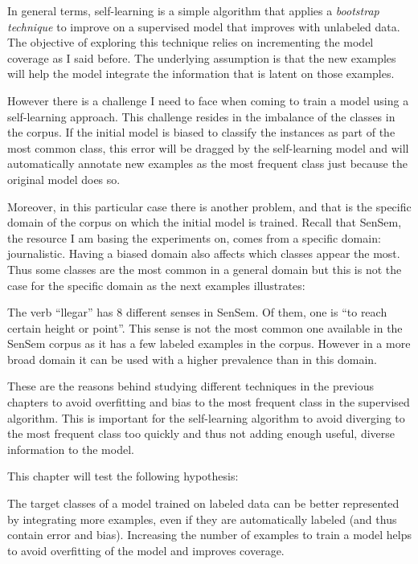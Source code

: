 In general terms, self-learning is a simple algorithm that applies a {\em
bootstrap technique} to improve on a supervised model that improves with
unlabeled data. The objective of exploring this technique relies on
incrementing the model coverage as I said before. The underlying assumption is
that the new examples will help the model integrate the information that is
latent on those examples.

However there is a challenge I need to face when coming to train a model using
a self-learning approach. This challenge resides in the imbalance of the
classes in the corpus. If the initial model is biased to classify the instances
as part of the most common class, this error will be dragged by the
self-learning model and will automatically annotate new examples as the most
frequent class just because the original model does so. 

Moreover, in this particular case there is another problem, and that is the
specific domain of the corpus on which the initial model is trained. Recall
that SenSem, the resource I am basing the experiments on, comes from a specific
domain: journalistic. Having a biased domain also affects which classes appear
the most. Thus some classes are the most common in a general domain but this is
not the case for the specific domain as the next examples illustrates:

\begin{example}
  The verb ``llegar'' has 8 different senses in SenSem. Of them, one is ``to
  reach certain height or point''. This sense is not the most common one
  available in the SenSem corpus as it has a few labeled examples in the
  corpus. However in a more broad domain it can be used with a higher
  prevalence than in this domain.
\end{example}

These are the reasons behind studying different techniques in the previous
chapters to avoid overfitting and bias to the most frequent class in the
supervised algorithm. This is important for the self-learning algorithm to
avoid diverging to the most frequent class too quickly and thus not adding
enough useful, diverse information to the model.

This chapter will test the following hypothesis:

\begin{hypothesis}\label{hyp:self-learning}
  The target classes of a model trained on labeled data can be better
  represented by integrating more examples, even if they are automatically
  labeled (and thus contain error and bias). Increasing the number of examples
  to train a model helps to avoid overfitting of the model and improves
  coverage.
\end{hypothesis}

